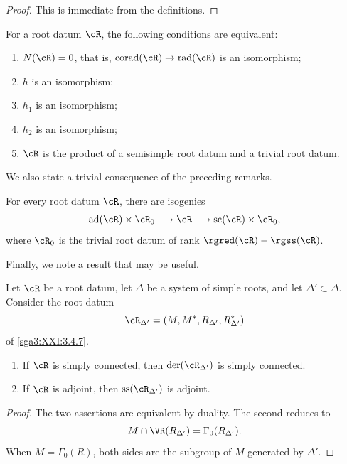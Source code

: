 \begin{proof}
This is immediate from the definitions.
\end{proof}

\begin{corollary}\label{sga3:XXI:6.5.9}
For a root datum \(\cR\), the following conditions are equivalent:
\begin{enumerate}
\item[(i)] \(N(\cR)=0\), that is,
  \(\operatorname{corad}(\cR)\to\operatorname{rad}(\cR)\) is an
  isomorphism;
\item[(ii)] \(h\) is an isomorphism;
\item[(iii)] \(h_1\) is an isomorphism;
\item[(iv)] \(h_2\) is an isomorphism;
\item[(v)] \(\cR\) is the product of a semisimple root datum and a
  trivial root datum.
\end{enumerate}
\end{corollary}

We also state a trivial consequence of the preceding remarks.

\begin{corollary}\label{sga3:XXI:6.5.10}
For every root datum \(\cR\), there are isogenies
\[
 \operatorname{ad}(\cR)\times\cR_0
 \longrightarrow\cR\longrightarrow
 \operatorname{sc}(\cR)\times\cR_0,
\]
where \(\cR_0\) is the trivial root datum of rank
\(\rgred(\cR)-\rgss(\cR)\).
\end{corollary}

Finally, we note a result that may be useful.

\begin{lemma}\label{sga3:XXI:6.5.11}
Let \(\cR\) be a root datum, let \(\Delta\) be a system of simple
roots, and let \(\Delta'\subset\Delta\). Consider the root datum
\[
 \cR_{\Delta'}=(M,M^\ast,R_{\Delta'},R^\ast_{\Delta'})
\]
of \ref{sga3:XXI:3.4.7}.
\begin{enumerate}
\item[(i)] If \(\cR\) is simply connected, then
  \(\operatorname{der}(\cR_{\Delta'})\) is simply connected.
\item[(ii)] If \(\cR\) is adjoint, then
  \(\operatorname{ss}(\cR_{\Delta'})\) is adjoint.
\end{enumerate}
\end{lemma}

\begin{proof}
The two assertions are equivalent by duality. The second reduces to
\[
 M\cap\VR(R_{\Delta'})=\Gamma_0(R_{\Delta'}).
\]
When \(M=\Gamma_0(R)\), both sides are the subgroup of \(M\) generated
by \(\Delta'\).
\end{proof}

